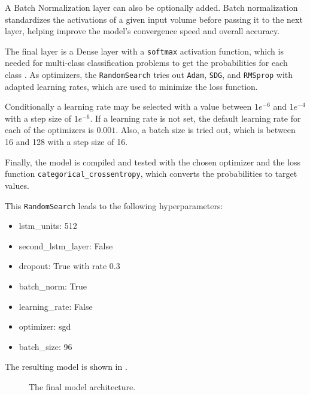 A Batch Normalization layer can also be optionally added.
Batch normalization standardizes the activations of a given input volume before passing it to the next layer, helping improve the model's convergence speed and overall accuracy.

The final layer is a Dense layer with a \texttt{softmax} activation function, which is needed for multi-class classification problems to get the probabilities for each class \cite{cat_cross_entropy}.
As optimizers, the \texttt{RandomSearch} tries out \texttt{Adam}, \texttt{SDG}, and \texttt{RMSprop} with adapted learning rates, which are used to minimize the loss function.

Conditionally a learning rate may be selected with a value between \(1e^{-6}\) and \(1e^{-4}\) with a step size of \(1e^{-6}\).
If a learning rate is not set, the default learning rate for each of the optimizers is \(0.001\).
Also, a batch size is tried out, which is between 16 and 128 with a step size of 16.

Finally, the model is compiled and tested with the chosen optimizer and the loss function \texttt{categorical\_crossentropy}, which converts the probabilities to target values.

This \texttt{RandomSearch} leads to the following hyperparameters:
\begin{itemize}
    \item lstm\_units: 512
    \item second\_lstm\_layer: False
    \item dropout: True with rate 0.3
    \item batch\_norm: True
    \item learning\_rate: False
    \item optimizer: sgd
    \item batch\_size: 96
\end{itemize}

The resulting model is shown in .
\begin{figure}[h!]
    \centering
    
    \caption{The final model architecture.}
    \label{final_model}
\end{figure}

